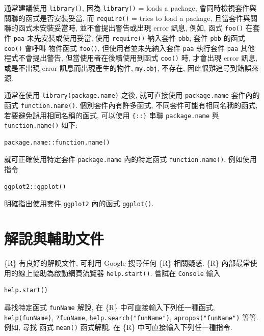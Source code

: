 \documentclass[
]{book}
\begin{document}
通常建議使用 \texttt{library()},
因為 \texttt{library()} = loads a package, 會同時檢視套件與關聯的函式是否安裝妥當,
而 \texttt{require()} = tries to load a package,
且當套件與關聯的函式未安裝妥當時,
並不會提出警告或出現 error 訊息,
例如, 函式 \texttt{foo()} 在套件 \texttt{paa} 未先安裝或使用妥當,
使用 \texttt{require()} 納入套件 \texttt{pbb},
套件 \texttt{pbb} 的函式 \texttt{coo()} 會呼叫 物件函式 \texttt{foo()},
但使用者並未先納入套件 \texttt{paa}
執行套件 \texttt{paa} 其他程式不會提出警告,
但當使用者在後續使用到函式 \texttt{coo()} 時,
才會出現 error 訊息,
或是不出現 error 訊息而出現產生的物件, \texttt{my.obj}, 不存在,
因此很難追尋到錯誤來源.

通常在使用 \texttt{library(package.name)}
之後, 就可直接使用 \texttt{package.name} 套件內的函式
\texttt{function.name()}.
個別套件內有許多函式,
不同套件可能有相同名稱的函式,
若要避免誤用相同名稱的函式,
可以使用 \texttt{\{::\}} 串聯
\texttt{package.name} 與 \texttt{function.name()} 如下:

\begin{verbatim}
package.name::function.name()           
\end{verbatim}

就可正確使用特定套件 \texttt{package.name} 內的特定函式 \texttt{function.name()}.
例如使用指令

\begin{verbatim}
ggplot2::ggplot()            
\end{verbatim}

明確指出使用套件 \texttt{ggplot2} 內的函式 \texttt{ggplot()}.

\hypertarget{ux89e3ux8aaaux8207ux8f14ux52a9ux6587ux4ef6}{%
\section{解說與輔助文件}\label{ux89e3ux8aaaux8207ux8f14ux52a9ux6587ux4ef6}}

\{R\} 有良好的解說文件,
可利用 Google 搜尋任何 \{R\} 相關疑惑.
\{R\} 內部最常使用的線上協助為啟動網頁流覽器
\texttt{help.start()}. 嘗試在 \texttt{Console} 輸入

\begin{verbatim}
help.start()               
\end{verbatim}

尋找特定函式 \texttt{funName} 解說,
在 \{R\} 中可直接輸入下列任一種函式,
\texttt{help(funName)},
\texttt{?funName},
\texttt{help.search("funName")},
\texttt{apropos("funName")} 等等.
例如, 尋找 函式 \texttt{mean()} 函式解說.
在 \{R\} 中可直接輸入下列任一種指令.
\end{document}
